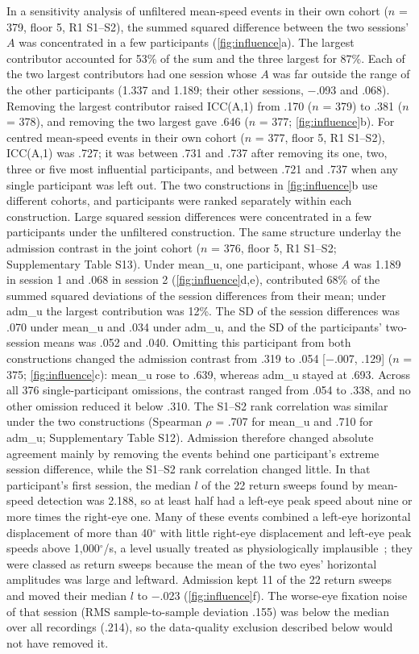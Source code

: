 In a sensitivity analysis of unfiltered mean-speed events in their own cohort ($n$ = 379, floor 5, R1 S1--S2), the summed squared difference between the two sessions' $A$ was concentrated in a few participants (\cref{fig:influence}a). The largest contributor accounted for 53\% of the sum and the three largest for 87\%. Each of the two largest contributors had one session whose $A$ was far outside the range of the other participants (1.337 and 1.189; their other sessions, $-$.093 and .068). Removing the largest contributor raised ICC(A,1) from .170 ($n$ = 379) to .381 ($n$ = 378), and removing the two largest gave .646 ($n$ = 377; \cref{fig:influence}b). For centred mean-speed events in their own cohort ($n$ = 377, floor 5, R1 S1--S2), ICC(A,1) was .727; it was between .731 and .737 after removing its one, two, three or five most influential participants, and between .721 and .737 when any single participant was left out. The two constructions in \cref{fig:influence}b use different cohorts, and participants were ranked separately within each construction. Large squared session differences were concentrated in a few participants under the unfiltered construction. The same structure underlay the admission contrast in the joint cohort ($n$ = 376, floor 5, R1 S1--S2; Supplementary Table S13). Under mean\_u, one participant, whose $A$ was 1.189 in session 1 and .068 in session 2 (\cref{fig:influence}d,e), contributed 68\% of the summed squared deviations of the session differences from their mean; under adm\_u the largest contribution was 12\%. The SD of the session differences was .070 under mean\_u and .034 under adm\_u, and the SD of the participants' two-session means was .052 and .040. Omitting this participant from both constructions changed the admission contrast from .319 to .054 [$-$.007, .129] ($n$ = 375; \cref{fig:influence}c): mean\_u rose to .639, whereas adm\_u stayed at .693. Across all 376 single-participant omissions, the contrast ranged from .054 to .338, and no other omission reduced it below .310. The S1--S2 rank correlation was similar under the two constructions (Spearman $\rho$ = .707 for mean\_u and .710 for adm\_u; Supplementary Table S12). Admission therefore changed absolute agreement mainly by removing the events behind one participant's extreme session difference, while the S1--S2 rank correlation changed little. In that participant's first session, the median $l$ of the 22 return sweeps found by mean-speed detection was 2.188, so at least half had a left-eye peak speed about nine or more times the right-eye one. Many of these events combined a left-eye horizontal displacement of more than 40$^\circ$ with little right-eye displacement and left-eye peak speeds above 1,000$^\circ$/s, a level usually treated as physiologically implausible~\citep{nystrom2010}; they were classed as return sweeps because the mean of the two eyes' horizontal amplitudes was large and leftward. Admission kept 11 of the 22 return sweeps and moved their median $l$ to $-$.023 (\cref{fig:influence}f). The worse-eye fixation noise of that session (RMS sample-to-sample deviation .155) was below the median over all recordings (.214), so the data-quality exclusion described below would not have removed it.

